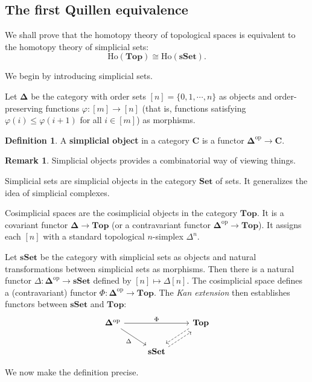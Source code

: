 \documentclass[psamsfonts]{amsart}
\theoremstyle{definition}
\newtheorem{defn}{Definition}[section]
\newtheorem{rem}{Remark}[section]
\newcommand{\Top}{\mathbf{Top}}
\newcommand{\sSet}{\mathbf{sSet}}
\newcommand{\Ho}{\mathrm{Ho}}
\numberwithin{equation}{section}
\begin{document}
\bigskip

\subsection{The first Quillen equivalence}\label{Section 2.2}

We shall prove that the homotopy theory of topological spaces is equivalent to the homotopy theory of simplicial sets:
\[\Ho(\Top)\cong\Ho(\sSet).\]

We begin by introducing simplicial sets.\smallbreak

Let $\mathbf{\Delta}$ be the category with order sets $[n]=\{0,1,\cdots,n\}$ as objects and order-preserving functions $\varphi:[m]\to[n]$ (that is, functions satisfying $\varphi(i)\leq\varphi(i+1)$ for all $i\in[m]$)
as morphisms.

\begin{defn}
A \textbf{simplicial object} in a category $\mathbf{C}$ is a functor $\mathbf{\Delta}^\textrm{op}\to\mathbf{C}$.
\end{defn}

\begin{rem}
Simplicial objects provides a combinatorial way of viewing things.

Simplicial sets are simplicial objects in the category $\mathbf{Set}$ of sets. It generalizes the idea of simplicial complexes.

Cosimplicial spaces are the cosimplicial objects in the category $\Top$. It is a covariant functor $\mathbf{\Delta}\to\Top$ (or a contravariant functor $\mathbf{\Delta}^\textrm{op}\to\Top$). It assigns each $[n]$ with a standard topological $n$-simplex $\Delta^n$.
\end{rem}

Let $\sSet$ be the category with simplicial sets as objects and natural transformations between simplicial sets as morphisms. Then there is a natural functor $\Delta:\mathbf{\Delta}^\textrm{op}\to\sSet$ defined by $[n]\mapsto\Delta[n]$. The cosimplicial space defines a (contravariant) functor $\Phi:\mathbf{\Delta}^\textrm{op}\to\Top$. The \textit{Kan extension} then establishes functors between $\sSet$ and $\Top$:
\[\begin{tikzcd}
\mathbf{\Delta}^\textrm{op}\arrow[dr,"\Delta"']\arrow[rr,"\Phi"]&&\Top\arrow[dl,shift right,dashed]\\
&\sSet\arrow[ur,shift right,dashed]
\end{tikzcd}\]

We now make the definition precise.
\end{document}
